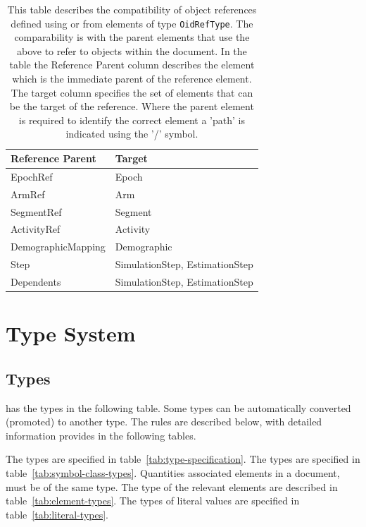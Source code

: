 \begin{table}[ht!]
\begin{center}
\small
\begin{tabular}{ll}\toprule
Reference Parent & Target \\\midrule
EpochRef & Epoch \\
ArmRef & Arm \\
SegmentRef & Segment\\
ActivityRef & Activity \\
DemographicMapping & Demographic\\
Step & SimulationStep, EstimationStep \\
Dependents & SimulationStep, EstimationStep \\\bottomrule
\end{tabular}
\end{center}
\caption{This table describes the compatibility of object
  references defined using  or from elements of type
  \texttt{OidRefType}. The comparability is with the parent elements
  that use the above to refer to objects within the \pharmml
  document. In the table the Reference Parent column describes the
  element which is the immediate parent of the reference element. The
  target column specifies the set of elements that can be the target
  of the reference. Where the parent element is required to identify
  the correct element a 'path' is indicated using the '/'
  symbol.}
\label{tab:oidref-targets}
\end{table}%


\section{Type System}

\subsection{Types}

\pharmml has the types in the following table. Some types can be
automatically converted (promoted) to another type. The rules are
described below, with detailed information provides in the following
tables.

\begin{valrules}
 The types are specified in table~\ref{tab:type-specification}.
 The types are specified in table~\ref{tab:symbol-class-types}.
 Quantities
associated elements in a \pharmml document, must be of the same
type. The type of the relevant elements are described in
table~\ref{tab:element-types}.
 The types of literal values
are specified in table~\ref{tab:literal-types}.
\end{valrules}

